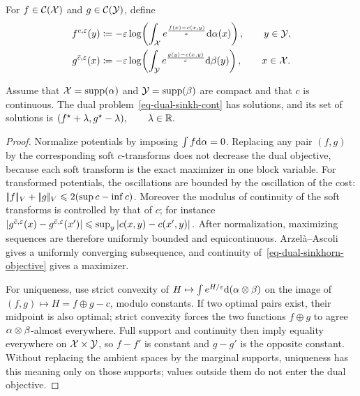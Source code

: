 \begin{defn}\label{def-continuous-soft-c-transform}
For $f\in\mathcal{C}(\mathcal{X})$ and $g\in\mathcal{C}(\mathcal{Y})$, define
\begin{align}
f^{c,\varepsilon}(y)
&\coloneqq
-\varepsilon\log\!\left(
\int_{\mathcal{X}}
e^{\frac{f(x)-c(x,y)}{\varepsilon}}\mathrm{d}\alpha(x)
\right),
\qquad y\in\mathcal{Y}, \label{eq-soft-c-cont-f}\\
g^{\bar c,\varepsilon}(x)
&\coloneqq
-\varepsilon\log\!\left(
\int_{\mathcal{Y}}
e^{\frac{g(y)-c(x,y)}{\varepsilon}}\mathrm{d}\beta(y)
\right),
\qquad x\in\mathcal{X}. \label{eq-soft-c-cont-g}
\end{align}
\end{defn}
\begin{prop}\label{prop-entropic-dual-potentials}
Assume that $\mathcal{X}=\operatorname{supp}(\alpha)$ and $\mathcal{Y}=\operatorname{supp}(\beta)$ are compact and that $c$ is continuous. The dual problem~\eqref{eq-dual-sinkh-cont} has solutions, and its set of solutions is
\((f^\star+\lambda,g^\star-\lambda), \qquad \lambda\in\mathbb{R}.\)
\end{prop}
\begin{proof}
Normalize potentials by imposing $\int f\mathrm{d}\alpha=0$. Replacing any pair $(f,g)$ by the corresponding soft $c$-transforms does not decrease the dual objective, because each soft transform is the exact maximizer in one block variable. For transformed potentials, the oscillations are bounded by the oscillation of the cost:
\(|\!| f |\!|_V+|\!| g |\!|_V \leqslant 2(\sup c-\inf c)\).
Moreover the modulus of continuity of the soft transforms is controlled by that of $c$; for instance
\(\left\lvert g^{\bar c,\varepsilon}(x)-g^{\bar c,\varepsilon}(x')\right\rvert \leqslant \sup_y\left\lvert c(x,y)-c(x',y)\right\rvert.\)
After normalization, maximizing sequences are therefore uniformly bounded and equicontinuous. Arzel\`a--Ascoli gives a uniformly converging subsequence, and continuity of~\eqref{eq-dual-sinkhorn-objective} gives a maximizer.

For uniqueness, use strict convexity of
\(H\mapsto \int e^{H/\varepsilon}\mathrm{d}(\alpha\otimes\beta)\)
on the image of $(f,g)\mapsto H=f\oplus g-c$, modulo constants. If two optimal pairs exist, their midpoint is also optimal; strict convexity forces the two functions $f\oplus g$ to agree $\alpha\otimes\beta$-almost everywhere. Full support and continuity then imply equality everywhere on $\mathcal{X}\times\mathcal{Y}$, so $f-f'$ is constant and $g-g'$ is the opposite constant. Without replacing the ambient spaces by the marginal supports, uniqueness has this meaning only on those supports; values outside them do not enter the dual objective.
\end{proof}

